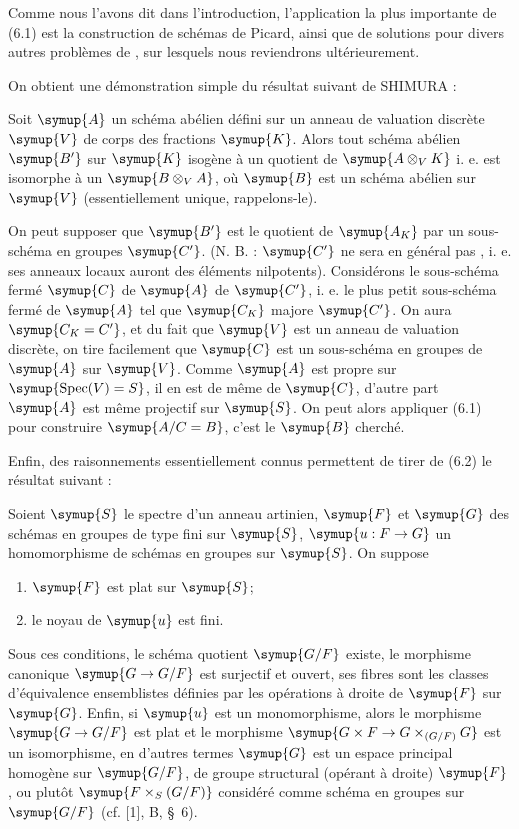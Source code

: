 
Comme nous l'avons dit dans l'introduction, l'application la plus importante
de (6.1) est la construction de schémas de Picard, ainsi que de solutions pour
divers autres problèmes de , sur lesquels nous reviendrons
ultérieurement.

On obtient une démonstration simple du résultat suivant de SHIMURA :

 Soit $\symup{A}$ un schéma abélien défini sur un anneau de
valuation discrète $\symup{V}$ de corps des fractions $\symup{K}$. Alors tout schéma abélien
$\symup{B'}$ sur $\symup{K}$ isogène à un quotient de $\symup{A\otimes_V K}$  i. e. est isomorphe à un $\symup{B\otimes_V A}$, où $\symup{B}$ est un
schéma abélien sur $\symup{V}$ (essentiellement unique, rappelons-le).

On peut supposer que $\symup{B'}$ est le quotient de $\symup{A_K}$ par un sous-schéma en
groupes $\symup{C'}$. (N. B. : $\symup{C'}$ ne sera en général pas , i. e. ses anneaux
locaux auront des éléments nilpotents). Considérons le sous-schéma fermé $\symup{C}$
de $\symup{A}$  de $\symup{C'}$, i. e. le plus petit sous-schéma fermé de $\symup{A}$ tel
que $\symup{C_K}$ majore $\symup{C'}$. On aura $\symup{C_K=C'}$, et du fait que $\symup{V}$ est un anneau de
valuation discrète, on tire facilement que $\symup{C}$ est un sous-schéma en groupes
de $\symup{A}$ sur $\symup{V}$. Comme $\symup{A}$ est propre sur $\symup{\operatorname{Spec}(V)=S}$, il en est
de même de $\symup{C}$, d'autre part $\symup{A}$ est même projectif sur $\symup{S}$. On peut alors
appliquer (6.1) pour construire $\symup{A/C=B}$,
c'est le $\symup{B}$ cherché.

Enfin, des raisonnements essentiellement connus permettent de tirer de (6.2)
le résultat suivant :

 Soient $\symup{S}$ le spectre d'un anneau artinien, $\symup{F}$ et
$\symup{G}$ des schémas en groupes de type fini sur $\symup{S}$, $\symup{u:F\to G}$ un homomorphisme
de schémas en groupes sur $\symup{S}$. On suppose
\begin{enumerate}
\item[(i)] $\symup{F}$ est plat sur $\symup{S}$;
\item[(ii)] le noyau de $\symup{u}$ est fini.
\end{enumerate}
Sous ces conditions, le schéma quotient $\symup{G/F}$ existe, le morphisme canonique
$\symup{G\to G/F}$ est surjectif et ouvert, ses fibres sont les classes d'équivalence
ensemblistes définies par les opérations à droite de $\symup{F}$ sur $\symup{G}$. Enfin, si
$\symup{u}$ est un monomorphisme, alors le morphisme $\symup{G\to G/F}$ est plat et le
morphisme $\symup{G\times F\to G\times_{(G/F)}G}$ est un isomorphisme, en d'autres termes $\symup{G}$ est un espace principal homogène
sur $\symup{G/F}$, de groupe structural (opérant à droite) $\symup{F}$, ou plutôt
$\symup{F\times_S(G/F)}$ considéré comme schéma en groupes sur $\symup{G/F}$ (cf. [1], B,
\S~6).

